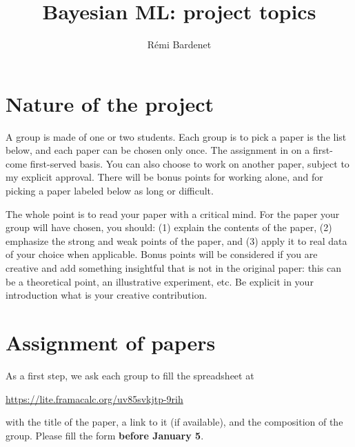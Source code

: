 \documentclass[12pt]{article}%
\begin{document}
\title{Bayesian ML: project topics}
\author{R\'emi Bardenet}
\maketitle

\section{Nature of the project}
A group is made of one or two students.
Each group is to pick a paper is the list below, and each paper can be chosen only once. 
The assignment in on a first-come first-served basis.
You can also choose to work on another paper, subject to my explicit approval.
There will be bonus points for working alone, and for picking a paper labeled below as long or difficult.

The whole point is to read your paper with a critical mind. 
For the paper your group will have chosen, you should: (1) explain the contents of the paper, (2) emphasize the strong and weak points of the paper, and (3) apply it to real data of your choice when applicable. 
Bonus points will be considered if you are creative and add something insightful that is not in the original paper: this can be a theoretical point, an illustrative experiment, etc. 
Be explicit in your introduction what is your creative contribution.

\section{Assignment of papers}
As a first step, we ask each group to fill the spreadsheet at
\begin{center}
   \href{https://lite.framacalc.org/uv85svkjtp-9rih}{https://lite.framacalc.org/uv85svkjtp-9rih}
 \end{center}
with the title of the paper, a link to it (if available), and the composition of the group.
Please fill the form {\bf before January 5}. %
\end{document}
